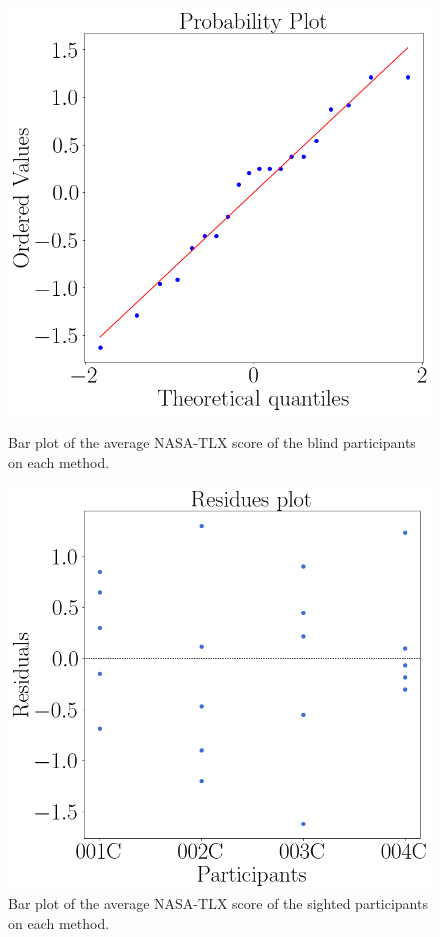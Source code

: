 \begin{figure}[!htb]
    \centering
    \begin{minipage}{0.45\textwidth}
        \centering
        \includegraphics[width = 0.8\linewidth]{Resultados/Nasa/Figuras/png/qqplot_nasa_var.png}
        \caption{Bar plot of the average NASA-TLX score of the blind participants on each method.}
        \label{fig:qqplot_nasa_var}
    \end{minipage}
    \begin{minipage}{0.45\textwidth}
        \centering
        \includegraphics[width = 0.8\linewidth]{Resultados/Nasa/Figuras/png/residplot_nasa_var.png}
        \caption{Bar plot of the average NASA-TLX score of the sighted participants on each method.}
        \label{fig:residplot_nasa_var}
    \end{minipage}
\end{figure}

